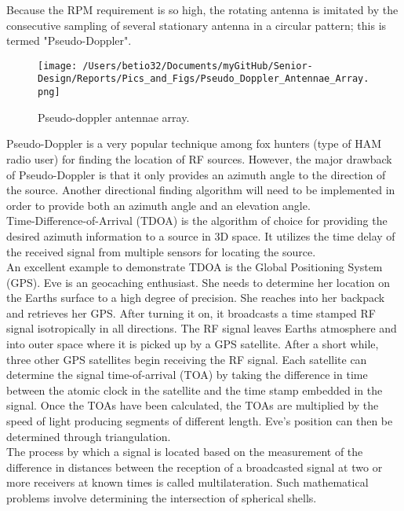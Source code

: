 \documentclass[12pt]{article}
\begin{document}
\noindent Because the RPM requirement is so high, the rotating antenna is imitated by the  consecutive sampling of several stationary antenna in a circular pattern; this is termed "Pseudo-Doppler".

\vspace{5mm}
    
\begin{figure}[!h]
	\centering
	\texttt{[image: /Users/betio32/Documents/myGitHub/Senior-Design/Reports/Pics\_and\_Figs/Pseudo\_Doppler\_Antennae\_Array.png]}
    \caption{Pseudo-doppler antennae array.} \label{fig:Doppler Array}
\end{figure}

\noindent Pseudo-Doppler is a very popular technique among fox hunters (type of HAM radio user) for finding the location of RF sources. However, the major drawback of Pseudo-Doppler is that it only provides an azimuth angle to the direction of the source. Another directional finding algorithm will need to be implemented in order to provide both an azimuth angle and an elevation angle.\\

\noindent Time-Difference-of-Arrival (TDOA) is the algorithm of choice for providing the desired azimuth information to a source in 3D space. It utilizes the time delay of the received signal from multiple sensors for locating the source.\\

\noindent An excellent example to demonstrate TDOA is the Global Positioning System (GPS). Eve is an geocaching enthusiast. She needs to determine her location on the Earths surface to a high degree of precision. She reaches into her backpack and retrieves her GPS. After turning it on, it broadcasts a time stamped RF signal isotropically in all directions. The RF signal leaves Earths atmosphere and into outer space where it is picked up by a GPS satellite. After a short while, three other GPS satellites begin receiving the RF signal. Each satellite can determine the signal time-of-arrival (TOA) by taking the difference in time between the atomic clock in the satellite and the time stamp embedded in the signal. Once the TOAs have been calculated, the TOAs are multiplied by the speed of light producing segments of different length. Eve's position can then be determined through triangulation.\\

\noindent The process by which a signal is located based on the measurement of the difference in distances between the reception of a broadcasted signal at two or more receivers at known times is called multilateration. Such mathematical problems involve determining the intersection of spherical shells.
    
\end{document}
